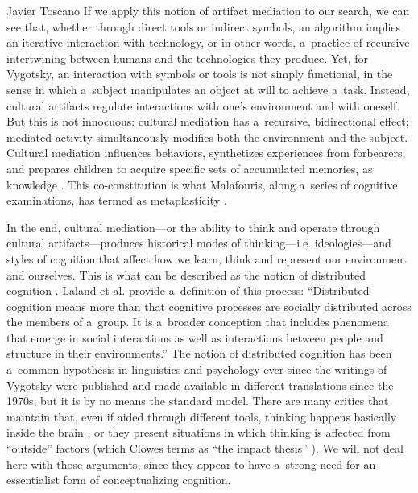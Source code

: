 \begin{artengenv}{Javier Toscano}
If we apply this notion of artifact mediation to our search, we can see that, whether through direct tools or indirect symbols, an algorithm implies an iterative interaction with technology, or in other words, a~practice of recursive intertwining between humans and the technologies they produce. Yet, for Vygotsky, an interaction with symbols or tools is not simply functional, in the sense in which a~subject manipulates an object at will to achieve a~task. Instead, cultural artifacts regulate interactions with one's environment and with oneself. But this is not innocuous: cultural mediation has a~recursive, bidirectional effect; mediated activity simultaneously modifies both the environment and the subject. Cultural mediation influences behaviors, synthetizes experiences from forbearers, and prepares children to acquire specific sets of accumulated memories, as knowledge
\parencite[see here also][]{connerton_how_1989}. %
 This co-constitution is what Malafouris, along a~series of cognitive examinations, has termed as metaplasticity 
\parencites[][]{malafouris_metaplasticity_2010}[][]{malafouris_how_2013}[][]{malafouris_metaplasticity_2015}.%


In the end, cultural mediation---or the ability to think and operate through cultural artifacts---produces historical modes of thinking---i.e. ideologies---and styles of cognition that affect how we learn, think and represent our environment and ourselves. This is what can be described as the notion of distributed cognition
\parencites[][]{salomon_cultural-historical_1993}[][]{gallagher_how_2005}[][]{gallagher_socially_2013}. %
 Laland et al. 
\parencite*[][p.177]{laland_niche_2000} %
 provide a~definition of this process: ``Distributed cognition means more than that cognitive processes are socially distributed across the members of a~group. It is a~broader conception that includes phenomena that emerge in social interactions as well as interactions between people and structure in their environments.'' The notion of distributed cognition has been a~common hypothesis in linguistics and psychology ever since the writings of Vygotsky were published and made available in different translations since the 1970s, but it is by no means the standard model. There are many critics that maintain that, even if aided through different tools, thinking happens basically inside the brain 
\parencites[][]{adams_bounds_2008}[][]{menary_defending_2010}[][]{loh_how_2016}, %
 or they present situations in which thinking is affected from ``outside'' factors (which Clowes
 \parencite*[][]{clowes_screen_2019} %
 terms as ``the impact thesis''%
). We will not deal here with those arguments, since they appear to have a~strong need for an essentialist form of conceptualizing cognition.


\end{artengenv}

